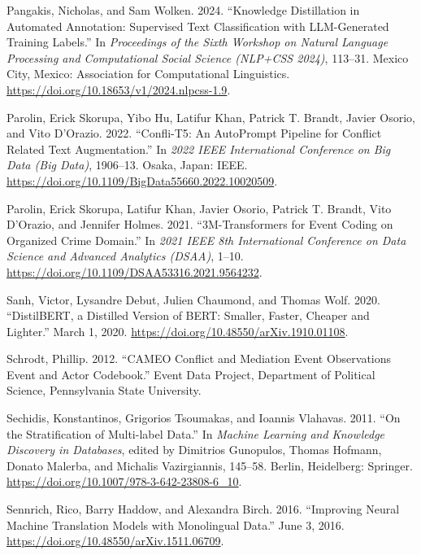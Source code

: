 \documentclass[
  11pt,
]{article}
\newlength{\cslhangindent}
\newenvironment{CSLReferences}[2] %
 {\begin{list}{}{%
  \setlength{\itemindent}{0pt}
  \setlength{\leftmargin}{0pt}
  \setlength{\parsep}{0pt}
  \ifodd #1
   \setlength{\leftmargin}{\cslhangindent}
   \setlength{\itemindent}{-1\cslhangindent}
  \fi
  \setlength{\itemsep}{#2\baselineskip}}}
 {\end{list}}
\begin{document}
\begin{CSLReferences}{1}{0}
Pangakis, Nicholas, and Sam Wolken. 2024. {``Knowledge {Distillation} in
{Automated Annotation}: {Supervised Text Classification} with
{LLM-Generated Training Labels}.''} In \emph{Proceedings of the {Sixth
Workshop} on {Natural Language Processing} and {Computational Social
Science} ({NLP}+{CSS} 2024)}, 113--31. Mexico City, Mexico: Association
for Computational Linguistics.
\url{https://doi.org/10.18653/v1/2024.nlpcss-1.9}.

Parolin, Erick Skorupa, Yibo Hu, Latifur Khan, Patrick T. Brandt, Javier
Osorio, and Vito D'Orazio. 2022. {``Confli-{T5}: {An AutoPrompt
Pipeline} for {Conflict Related Text Augmentation}.''} In \emph{2022
{IEEE International Conference} on {Big Data} ({Big Data})}, 1906--13.
Osaka, Japan: IEEE.
\url{https://doi.org/10.1109/BigData55660.2022.10020509}.

Parolin, Erick Skorupa, Latifur Khan, Javier Osorio, Patrick T. Brandt,
Vito D'Orazio, and Jennifer Holmes. 2021. {``{3M-Transformers} for
{Event Coding} on {Organized Crime Domain}.''} In \emph{2021 {IEEE} 8th
{International Conference} on {Data Science} and {Advanced Analytics}
({DSAA})}, 1--10. \url{https://doi.org/10.1109/DSAA53316.2021.9564232}.

Sanh, Victor, Lysandre Debut, Julien Chaumond, and Thomas Wolf. 2020.
{``{DistilBERT}, a Distilled Version of {BERT}: Smaller, Faster, Cheaper
and Lighter.''} March 1, 2020.
\url{https://doi.org/10.48550/arXiv.1910.01108}.

Schrodt, Phillip. 2012. {``{CAMEO Conflict} and {Mediation Event
Observations Event} and {Actor Codebook}.''} Event Data Project,
Department of Political Science, Pennsylvania State University.

Sechidis, Konstantinos, Grigorios Tsoumakas, and Ioannis Vlahavas. 2011.
{``On the {Stratification} of {Multi-label Data}.''} In \emph{Machine
{Learning} and {Knowledge Discovery} in {Databases}}, edited by
Dimitrios Gunopulos, Thomas Hofmann, Donato Malerba, and Michalis
Vazirgiannis, 145--58. Berlin, Heidelberg: Springer.
\url{https://doi.org/10.1007/978-3-642-23808-6_10}.

Sennrich, Rico, Barry Haddow, and Alexandra Birch. 2016. {``Improving
{Neural Machine Translation Models} with {Monolingual Data}.''} June 3,
2016. \url{https://doi.org/10.48550/arXiv.1511.06709}.


\end{CSLReferences}
\end{document}
